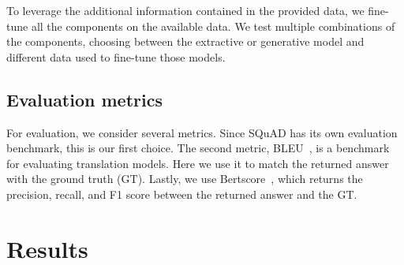 \documentclass[fleqn,moreauthors,10pt]{ds_report}
\begin{document}
\noindent To leverage the additional information contained in the provided data, we fine-tune all the components on the available data.
We test multiple combinations of the components, choosing between the extractive or generative model and different data used to fine-tune those models.

\subsection*{Evaluation metrics}
For evaluation, we consider several metrics. Since SQuAD has its own evaluation benchmark, this is our first choice. 
The second metric, BLEU~\cite{papineni2002bleu}, is a benchmark for evaluating translation models. Here we use it to match the returned answer with the ground truth (GT).
Lastly, we use Bertscore~\cite{zhang2019bertscore}, which returns the precision, recall, and F1 score between the returned answer and the GT.

\section*{Results}
\end{document}
